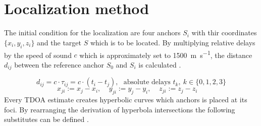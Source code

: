 %

\section{Localization method}

The initial condition for the localization are four anchors $S_i$ with thir coordinates $\{x_i,y_i,z_i\}$ and the target $S$ which is to be located. By multiplying relative delays by the speed of sound $c$ which is approximately set to \SI{1500}{\meter\per\second}, the distance $d_{ij}$ between the reference anchor $S_0$ and $S_i$ is calculated  \cite{yang11}.

\begin{equation}
	d_{ij}=c\cdot\tau_{ij}=c\cdot (t_i-t_j),~~~\text{absolute delays } t_k,~k\in \{0,1,2,3\}
\end{equation}
\begin{equation}
	x_{ji}:=x_j-x_i,~~~~~
	y_{ji}:=y_j-y_i,~~~~~
	z_{ji}:=z_j-z_i~~~~~
\end{equation}
Every TDOA estimate creates hyperbolic curves which anchors is placed at its foci. 
By rearranging the derivation of hyperbola intersections the following substitutes can be defined \cite{bucher02}. 


